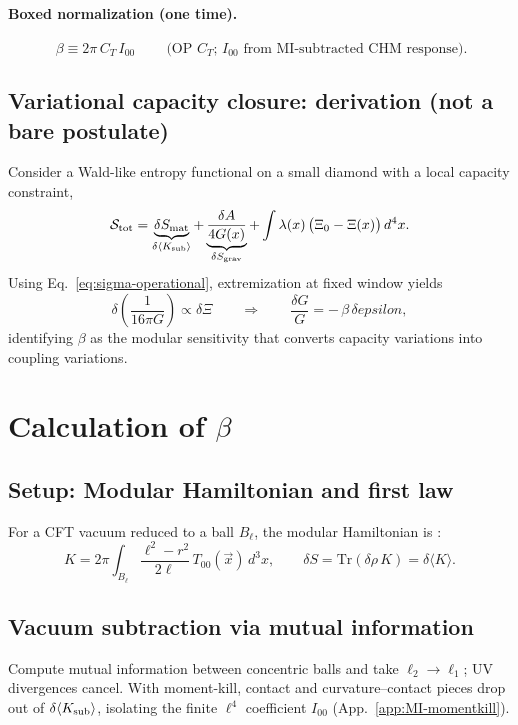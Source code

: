 \documentclass[aps,prd,onecolumn,superscriptaddress,nofootinbib]{revtex4-2}
\def\eps{epsilon}%
\def\boxed#1{#1}%
\newcommand{\eps}{\varepsilon}
\begin{document}
\paragraph*{Boxed normalization (one time).}
\begin{equation}
\boxed{\ \beta \equiv 2\pi\, C_T\, I_{00}\ }\qquad
\text{(OP $C_T$; $I_{00}$ from MI-subtracted CHM response).}
\label{eq:beta-box}
\end{equation}

\subsection{Variational capacity closure: derivation (not a bare postulate)}
\label{sec:variational-closure}
Consider a Wald-like entropy functional on a small diamond with a local capacity constraint,
\begin{equation}
\mathcal{S}_{\rm tot} = \underbrace{\delta S_{\rm mat}}_{\delta\langle K_{\rm sub}\rangle} + \underbrace{\frac{\delta A}{4G(x)}}_{\delta S_{\rm grav}} + \int \lambda(x)\,\big(\Xi_0-\Xi(x)\big)\,d^4x.
\end{equation}
Using Eq.~\eqref{eq:sigma-operational}, extremization at fixed window yields
\begin{equation}
\delta\!\left(\frac{1}{16\pi G}\right) \propto \delta \Xi
\qquad\Rightarrow\qquad
\frac{\delta G}{G} = -\,\beta\,\delta \eps,
\end{equation}
identifying $\beta$ as the modular sensitivity that converts capacity variations into coupling variations.

\section{Calculation of \texorpdfstring{$\beta$}{beta}}
\label{sec:beta-calc}

\subsection{Setup: Modular Hamiltonian and first law}
For a CFT vacuum reduced to a ball $B_\ell$, the modular Hamiltonian is \cite{Casini2011}:
\begin{equation}
K = 2\pi \int_{B_\ell} \frac{\ell^2 - r^2}{2\ell}\, T_{00}(\vec{x})\, d^3x,
\qquad
\delta S = \mathrm{Tr}(\delta\rho\, K) = \delta \langle K \rangle.
\end{equation}

\subsection{Vacuum subtraction via mutual information}
Compute mutual information between concentric balls and take $\ell_2\to\ell_1$; UV divergences cancel. With moment-kill, contact and curvature--contact pieces drop out of $\delta\langle K_{\rm sub}\rangle$, isolating the finite $\ell^4$ coefficient $I_{00}$ (App.~\ref{app:MI-momentkill}).
\end{document}
